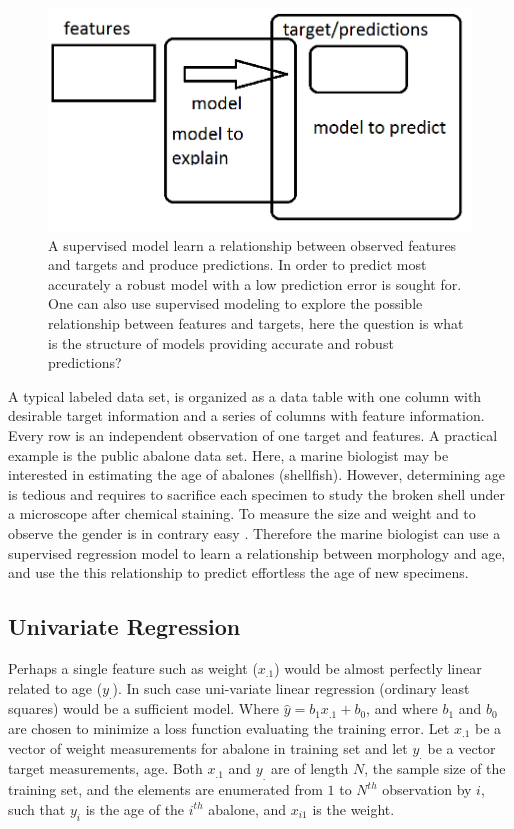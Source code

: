 \begin{figure}
\includegraphics[width=\textwidth,height=\textheight,keepaspectratio]{graphics/modelPredictExplain.png}
\caption{A supervised model learn a relationship between observed features and targets and produce predictions. In order to predict most accurately a robust model with a low prediction error is sought for. One can also use supervised modeling to explore the possible relationship between features and targets, here the question is what is the structure of models providing accurate and robust predictions?}
\label{modelPreditExplain}
\end{figure}

A typical labeled data set, is organized as a data table with one column with desirable target information and a series of columns with feature information. Every row is an independent observation of one target and features. A practical example is the public abalone data set. Here, a marine biologist may be interested in estimating the age of abalones (shellfish). However, determining age is tedious and requires to sacrifice each specimen to study the broken shell under a microscope after chemical staining. To measure the size and weight and to observe the gender is in contrary easy \cite{lichman2013uci}. Therefore the marine biologist can use a supervised regression model to learn a relationship between morphology and age, and use the this relationship to predict effortless the age of new specimens.

\subsection{Univariate Regression}
Perhaps a single feature such as weight ($x_{.1}$) would be almost perfectly linear related to age ($y_.$). In such case uni-variate linear regression (ordinary least squares) would be a sufficient model. Where $\hat{y} = b_1 x_{.1} + b_0$, and where $b_1$ and $b_0$ are chosen to minimize a loss function evaluating the training error. Let $x_{.1}$ be a vector of weight measurements for abalone in training set and let $y_.$ be a vector target measurements, age. Both $x_.1$ and $y_.$ are of length $N$, the sample size of the training set, and the elements are enumerated from $1$ to $N^{th}$ observation by $i$, such that $y_i$ is the age of the $i^{th}$ abalone, and $x_{i1}$ is the weight.

